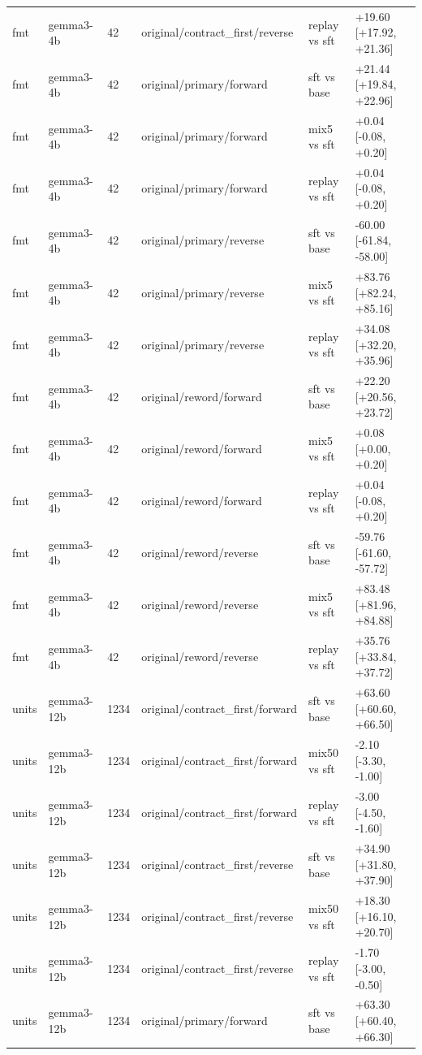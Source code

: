 \begin{table}[t]
\begin{tabular}{llllll}
fmt & gemma3-4b & 42 & original/contract\_first/reverse & replay vs sft & +19.60 [+17.92, +21.36] \\
fmt & gemma3-4b & 42 & original/primary/forward & sft vs base & +21.44 [+19.84, +22.96] \\
fmt & gemma3-4b & 42 & original/primary/forward & mix5 vs sft & +0.04 [-0.08, +0.20] \\
fmt & gemma3-4b & 42 & original/primary/forward & replay vs sft & +0.04 [-0.08, +0.20] \\
fmt & gemma3-4b & 42 & original/primary/reverse & sft vs base & -60.00 [-61.84, -58.00] \\
fmt & gemma3-4b & 42 & original/primary/reverse & mix5 vs sft & +83.76 [+82.24, +85.16] \\
fmt & gemma3-4b & 42 & original/primary/reverse & replay vs sft & +34.08 [+32.20, +35.96] \\
fmt & gemma3-4b & 42 & original/reword/forward & sft vs base & +22.20 [+20.56, +23.72] \\
fmt & gemma3-4b & 42 & original/reword/forward & mix5 vs sft & +0.08 [+0.00, +0.20] \\
fmt & gemma3-4b & 42 & original/reword/forward & replay vs sft & +0.04 [-0.08, +0.20] \\
fmt & gemma3-4b & 42 & original/reword/reverse & sft vs base & -59.76 [-61.60, -57.72] \\
fmt & gemma3-4b & 42 & original/reword/reverse & mix5 vs sft & +83.48 [+81.96, +84.88] \\
fmt & gemma3-4b & 42 & original/reword/reverse & replay vs sft & +35.76 [+33.84, +37.72] \\
units & gemma3-12b & 1234 & original/contract\_first/forward & sft vs base & +63.60 [+60.60, +66.50] \\
units & gemma3-12b & 1234 & original/contract\_first/forward & mix50 vs sft & -2.10 [-3.30, -1.00] \\
units & gemma3-12b & 1234 & original/contract\_first/forward & replay vs sft & -3.00 [-4.50, -1.60] \\
units & gemma3-12b & 1234 & original/contract\_first/reverse & sft vs base & +34.90 [+31.80, +37.90] \\
units & gemma3-12b & 1234 & original/contract\_first/reverse & mix50 vs sft & +18.30 [+16.10, +20.70] \\
units & gemma3-12b & 1234 & original/contract\_first/reverse & replay vs sft & -1.70 [-3.00, -0.50] \\
units & gemma3-12b & 1234 & original/primary/forward & sft vs base & +63.30 [+60.40, +66.30] \\

\end{tabular}
\end{table}
